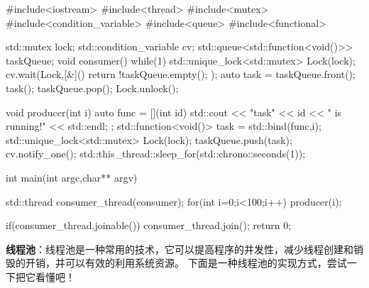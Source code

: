 \begin{tcode}
#include<iostream>
#include<thread>
#include<mutex>
#include<condition_variable>
#include<queue>
#include<functional>

std::mutex lock;
std::condition_variable cv;
std::queue<std::function<void()>> taskQueue;
void consumer(){
    while(1){
        std::unique_lock<std::mutex> Lock(lock);
        cv.wait(Lock,[&](){
            return !taskQueue.empty();
        });
        auto task = taskQueue.front();
        task();
        taskQueue.pop();
        Lock.unlock();
    }
}

void producer(int i){
    auto func = [](int id){
        std::cout << "task" << id << " is running!" << std::endl;
    };
    std::function<void()> task = std::bind(func,i);
    {
        std::unique_lock<std::mutex> Lock(lock);
        taskQueue.push(task);
    }
    cv.notify_one();
    std::this_thread::sleep_for(std::chrono::seconds(1));
}

int main(int argc,char** argv){
    std::thread consumer_thread(consumer);
    for(int i=0;i<100;i++){
        producer(i);
    }

    if(consumer_thread.joinable())
        consumer_thread.join();
    return 0;
}
\end{tcode}

\textbf{线程池}：线程池是一种常用的技术，它可以提高程序的并发性，减少线程创建和销毁的开销，并可以有效的利用系统资源。
下面是一种线程池的实现方式，尝试一下把它看懂吧！


